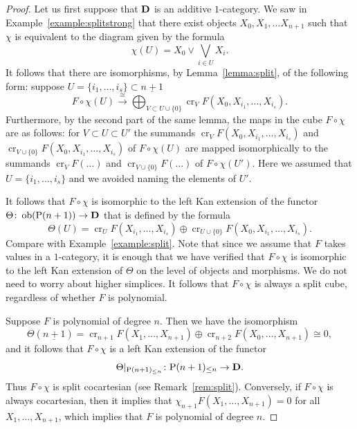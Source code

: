 \documentclass[psamsfonts]{amsart}
\theoremstyle{plain}
\theoremstyle{definition}
\theoremstyle{remark}
\newcommand{\catname}[1]{{\normalfont\textbf{#1}}}
\newcommand{\ob}{\operatorname{ob}}
\newcommand{\power}{\mathrm{P}}
\DeclareMathOperator{\ce}{cr}
\begin{document}
\begin{proof}
Let us first suppose that $\catname{D}$ is an additive $1$-category. We saw in Example~\ref{example:splitstrong} that there exist objects $X_0, X_1, \ldots X_{n+1}$ such that $\chi$ is equivalent to the diagram given by the formula
\[
\chi(U)=X_0\vee \bigvee_{i\in U} X_i.
\]
It follows that there are isomorphisms, by Lemma~\ref{lemma:split}, of the following form: suppose $U=\{i_1, \ldots, i_s\}\subset\underline{n+1}$
\[
F\circ \chi(U)\xrightarrow{\cong} \bigoplus_{V\subset U\cup \{0\}} \ce_V F(X_0, X_{i_1}, \ldots, X_{i_s}).
\]
Furthermore, by the second part of the same lemma, the maps in the cube $F\circ \chi$ are as follows: for $V\subset U\subset U'$ the summands $\ce_V F(X_0, X_{i_1}, \ldots, X_{i_s})$ and $\ce_{V\cup \{0\}} F(X_0, X_{i_1}, \ldots, X_{i_s})$ of $F\circ \chi(U)$ are mapped isomorphically to the summands  $\ce_VF(\ldots)$ and $\ce_{V\cup \{0\}} F(\ldots)$ of $F\circ \chi(U')$. Here we assumed that $U=\{i_1, \ldots, i_s\}$ and we avoided naming the elements of $U'$.

It follows that $F\circ \chi$ is isomorphic to the left Kan extension of the functor $\Theta\colon \ob(\power(n+1))\to \catname{D}$ that is defined by the formula
\[
\Theta(U)= \ce_UF(X_{i_1}, \ldots, X_{i_s})\oplus \ce_{U\cup \{0\}}F(X_0, X_{i_1}, \ldots, X_{i_s}).
\]
Compare with Example~\ref{example:split}. Note that since we assume that $F$ takes values in a $1$-category, it is enough that we have verified that $F\circ \chi$ is isomorphic to the left Kan extension of $\Theta$ on the level of objects and morphisms. We do not need to worry about higher simplices. It follows that $F\circ \chi$ is always a split cube, regardless of whether $F$ is polynomial.

Suppose $F$ is polynomial of degree $n$. Then we have the isomorphism
\[
\Theta(\underline{n+1})=\ce_{n+1}F(X_{1}, \ldots, X_{n+1})\oplus \ce_{n+2}F(X_{0}, \ldots, X_{n+1})\cong 0,
\]
and it follows that $F\circ \chi$ is a left Kan extension of the functor 
\[
\Theta|_{\power(n+1)_{\le n}}\colon \power(n+1)_{\le n}\to \catname{D}.
\] 
Thus $F\circ \chi$ is split cocartesian (see Remark~\ref{rem:split}). Conversely, if $F\circ \chi$ is always cocartesian, then it implies that $\chi_{n+1}F(X_{1}, \ldots, X_{n+1})=0$ for all $X_1, \ldots, X_{n+1}$, which implies that $F$ is polynomial of degree $n$.


\end{proof}
\end{document}
